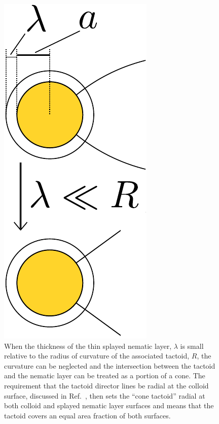 \documentclass[%
 aip,
 amsmath,amssymb,
 reprint,%
]{revtex4-1}
\begin{document}
\begin{figure}[h]
\centering
\includegraphics[scale=0.75]{media/190812-tactoidWLAreaReductionSchematic-v2.pdf}
\caption{When the thickness of the thin splayed nematic layer, $\lambda$ is small relative to the radius of curvature of the associated tactoid, $R$, the curvature can be neglected and the intersection between the tactoid and the nematic layer can be treated as a portion of a cone. The requirement that the tactoid director lines be radial at the colloid surface, discussed in Ref.~, then sets the ``cone tactoid'' radial at both colloid and splayed nematic layer surfaces and means that the tactoid covers an equal area fraction of both surfaces.}
\label{fig:tactoidColloidWLEquivAreaFraction}
\end{figure}
\end{document}
